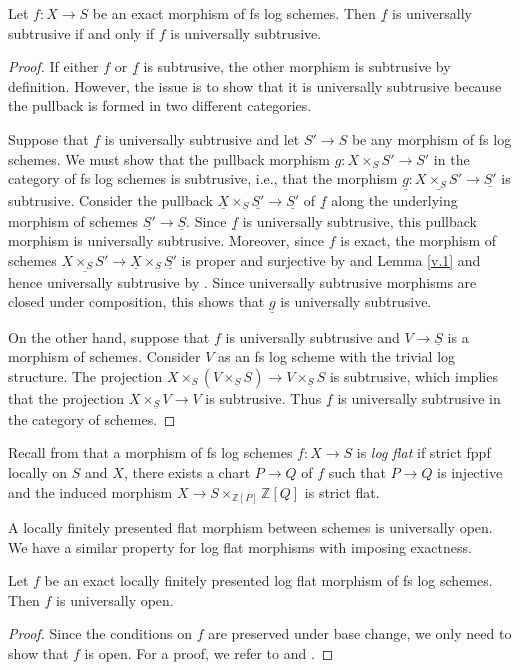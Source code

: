 \documentclass[10pt]{amsart}
\newcommand{\Z}{\mathbb{Z}}
\newcommand{\ul}{\underline}
\begin{document}
\begin{proposition}\label{prop:exact}
\label{v.2}
Let $f\colon X\to S$ be an exact morphism of fs log schemes.
Then $\ul{f}$ is universally subtrusive if and only if 
$f$ is universally subtrusive.
\end{proposition}
\begin{proof}
If either $f$ or $\ul{f}$ is subtrusive, the other morphism is subtrusive by definition. However, the issue is to show that it is universally subtrusive because the pullback is formed in two different categories.

Suppose that $\ul{f}$ is universally subtrusive and let $S' \to S$ be any morphism of fs log schemes. We must show that the pullback morphism $g \colon X \times_S S' \to S'$ in the category of fs log schemes is subtrusive, i.e., that the morphism $\ul{g} \colon \ul{X\times_S S'} \to \ul{S'}$ is subtrusive. 
Consider the pullback $\ul{X}\times_{\ul{S}}\ul{S'} \to \ul{S'}$ of $\ul{f}$ along the underlying morphism of schemes $\ul{S'} \to \ul{S}$. Since $\ul{f}$ is universally subtrusive, this pullback morphism is universally subtrusive. 
Moreover, since $f$ is exact, the morphism of schemes
$\ul{X\times_S S'} {\longrightarrow} \ul{X}\times_{\ul{S}}\ul{S'}$ is proper and surjective by \cite[Corollary III.2.2.4]{Ogu} and Lemma \ref{v.1} and hence universally subtrusive by \cite[Remark 2.5 (1a)]{Rydh}.
Since universally subtrusive morphisms are closed under composition, 
this shows that $\ul{g}$ is universally subtrusive.

On the other hand, 
suppose that $f$ is universally subtrusive and $V \to \ul{S}$ is a morphism of schemes. 
Consider $V$ as an fs log scheme with the trivial log structure.
The projection $X\times_S (V\times_{\ul{S}}S)\to V\times_{\ul{S}} S$ is subtrusive, which implies that the projection $X\times_{\ul{S}}V\to V$ is subtrusive.
Thus $\ul{f}$ is universally subtrusive in the category of schemes.
\end{proof}

Recall from \cite[§1.10]{KatoLog2} that a morphism of fs log schemes $f\colon X\to S$ is \emph{log flat} if strict fppf locally on $S$ and $X$,
there exists a chart $P\to Q$ of $f$ such that $P\to Q$ is injective and the induced morphism $X\to S\times_{\Z[P]}\Z[Q]$ is strict flat.

A locally finitely presented flat morphism between schemes is universally open.
We have a similar property for log flat morphisms with imposing exactness.

\begin{lemma}\label{lem:logflatexact}
Let $f$ be an exact locally finitely presented log flat morphism of fs log schemes. Then $f$ is universally open.
\end{lemma}
\begin{proof}
Since the conditions on $f$ are preserved under base change, we only need to show that $f$ is open.
For a proof, 
we refer to \cite[Proposition 5.6, Remark 5.7]{quasi-section} and \cite[Proposition 2.5]{KatoLog2}.
\end{proof}
\end{document}
